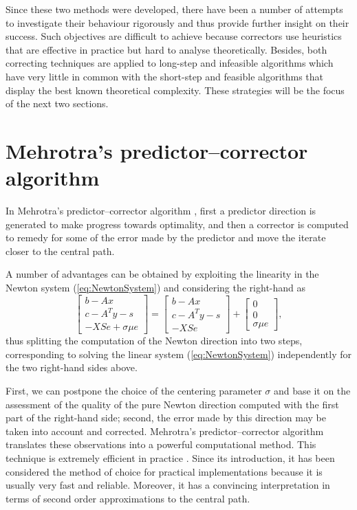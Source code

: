 Since these two methods were developed, there have been a number of 
attempts to investigate their behaviour rigorously and thus provide
further insight on their success. 
Such objectives are difficult to achieve because 
correctors use heuristics that are effective in practice but hard 
to analyse theoretically. 
Besides, both correcting techniques are applied to long-step and infeasible 
algorithms which have very little in common with the short-step and 
feasible algorithms that display the best known theoretical complexity.
These strategies will be the focus of the next two sections.


%
%
\section{Mehrotra's predictor--corrector algorithm}
\label{sec:MehrotraPC}

In Mehrotra's predictor--corrector algorithm \cite{Mehrotra92}, 
first a predictor direction is generated 
to make progress towards optimality, and then 
a corrector is computed to remedy for some of the error made by the predictor
and move the iterate closer to the central path.

A number of advantages can be obtained by exploiting the
linearity in the Newton system (\ref{eq:NewtonSystem}) and
considering the right-hand as
\[
 \left[ 
  \begin{array}{c}
    b-Ax \\ c-A^Ty-s \\ -XSe + \sigma\mu e
  \end{array} \right]
 = \left[ 
  \begin{array}{c}
    b-Ax \\ c-A^Ty-s \\ -XSe
  \end{array} \right]
 + \left[ 
  \begin{array}{c}
    0 \\ 0 \\ \sigma\mu e
  \end{array} \right],
\]
thus splitting the computation 
of the Newton direction into two steps, corresponding to solving the linear
system (\ref{eq:NewtonSystem}) independently for the two right-hand 
sides above.

First, we can postpone the choice of the centering parameter 
$\sigma$ and base it on the assessment of the quality of the 
pure Newton direction computed with the first part of the right-hand side;
second, the error made by this direction may be 
taken into account and
corrected. Mehrotra's predictor--corrector algorithm \cite{Mehrotra92}
translates these observations into a powerful computational method.
This technique
is extremely efficient in practice \cite{LustigMarstenShanno,Mehrotra92}. 
Since its introduction, it has 
been considered the method of choice for practical implementations 
because it is usually very fast and reliable. Moreover, it has a 
convincing interpretation in terms of second order approximations
to the central path.


